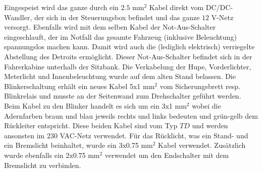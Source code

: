 Eingespeist wird das ganze durch ein $2.5$ mm$^2$ Kabel direkt vom DC/DC-Wandler, der sich in der Steuerungsbox befindet und das ganze $12$ V-Netz versorgt. Ebenfalls wird mit dem selben Kabel der Not-Aus-Schalter eingeschlauft, der im Notfall das gesamte Fahrzeug (inklusive Beleuchtung) spannungslos machen kann. Damit wird auch die (lediglich elektrisch) verriegelte Abstellung des Detroits ermöglicht. Dieser Not-Aus-Schalter befindet sich in der Fahrerkabine unterhalb der Sitzbank. Die Verkabelung der Hupe, Vorderlichter, Meterlicht und Innenbeleuchtung wurde auf dem alten Stand belassen. Die Blinkerschaltung erhält ein neues Kabel 5x1 mm$^2$ vom Sicherungsbrett resp. Blinkrelais und musste an der Seitenwand zum Drehschalter geführt werden. Beim Kabel zu den Blinker handelt es sich um ein 3x1 mm$^2$ wobei die Adernfarben braun und blau jeweils rechts und links bedeuten und grün-gelb dem Rückleiter entspricht. Diese beiden Kabel sind vom Typ $TD$ und werden ansonsten im $230$ VAC-Netz verwendet. Für das Rücklicht, was ein Stand- und ein Bremslicht beinhaltet, wurde ein 3x0.75 mm$^2$ Kabel verwendet. Zusätzlich wurde ebenfalls ein 2x0.75 mm$^2$ verwendet um den Endschalter mit dem Bremslicht zu verbinden.

\color{black}
